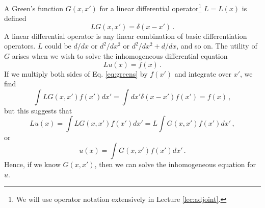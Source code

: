 A Green's function $G(x,x')$ for a linear differential operator\footnote{We will use operator notation extensively in Lecture \ref{lec:adjoint}.} $L=L(x)$ is defined
\begin{equation}
 LG(x,x') = \delta(x-x') \, .
 \label{eq:greens}
\end{equation}
A linear differential operator is any linear combination of basic differentiation operators.  $L$ could be $d/dx$ or $d^2/dx^2$ or $d^2/dx^2 + d/dx$, and so on.  The utility of $G$ arises when we wish to solve the inhomogeneous differential equation
\begin{equation}
 Lu(x) = f(x) \, .
 \label{eq:diffeq}
\end{equation}
If we multiply both sides of Eq. \ref{eq:greens} by $f(x')$ and integrate over $x'$, we find
\begin{equation}
 \int LG(x,x')f(x')dx' = \int dx' \delta(x-x') f(x') = f(x) \, ,
\end{equation}
but this suggests that
\begin{equation}
 Lu(x) = \int LG(x,x')f(x')dx' = L \int G(x,x')f(x')dx'  \, ,
\end{equation}
or 
\begin{equation}
 u(x) = \int G(x,x')f(x')dx'  \, .
\end{equation}
Hence, if we know $G(x,x')$, then we can solve the inhomogeneous equation for $u$.  

